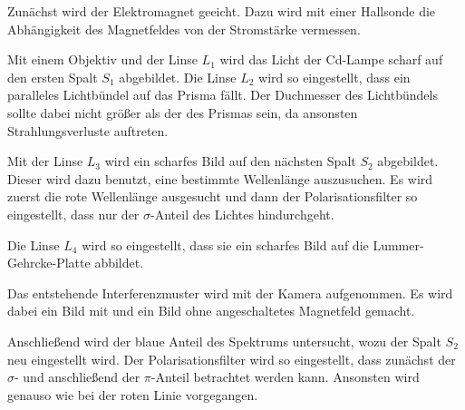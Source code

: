 Zunächst wird der Elektromagnet geeicht. Dazu wird mit einer Hallsonde die Abhängigkeit des Magnetfeldes von der Stromstärke
vermessen.

Mit einem Objektiv und der Linse $L_1$ wird das Licht der Cd-Lampe scharf auf den ersten Spalt $S_1$ abgebildet. Die Linse $L_2$
wird so eingestellt, dass ein paralleles Lichtbündel auf das Prisma fällt. Der Duchmesser des Lichtbündels sollte
dabei nicht größer als der des Prismas sein, da ansonsten Strahlungsverluste auftreten.

Mit der Linse $L_3$ wird ein scharfes Bild auf den nächsten Spalt $S_2$ abgebildet. Dieser wird dazu benutzt, eine bestimmte
Wellenlänge auszusuchen. Es wird zuerst die rote Wellenlänge ausgesucht und dann der Polarisationsfilter so eingestellt,
dass nur der $\sigma$-Anteil des Lichtes hindurchgeht.

Die Linse $L_4$ wird so eingestellt, dass sie ein scharfes Bild auf die Lummer-Gehrcke-Platte abbildet.

Das entstehende Interferenzmuster wird mit der Kamera aufgenommen. Es wird dabei ein Bild mit und ein Bild ohne angeschaltetes
Magnetfeld gemacht.

Anschließend wird der blaue Anteil des Spektrums untersucht, wozu der Spalt $S_2$ neu eingestellt wird. Der Polarisationsfilter
wird so eingestellt, dass zunächst der $\sigma$- und anschließend der $\pi$-Anteil betrachtet werden kann.
Ansonsten wird genauso wie bei der roten Linie vorgegangen.
